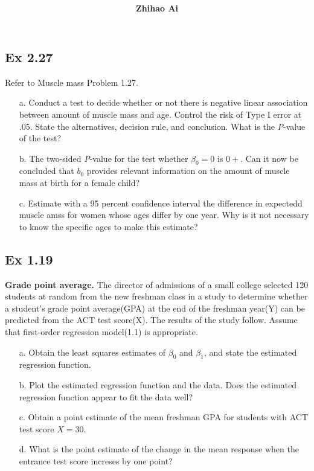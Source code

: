 \documentclass[10pt]{report}
\title{
	\vspace{2in}
	\textmd{\textbf{\hwCourse\\\hwTitle}}\\
	\vspace{0.3in}\large{\textit{\hmwkClassInstructor}}
	\vspace{3in}
}
\author{\textbf{Zhihao Ai}}
\date{}
\begin{document}
\maketitle

\subsection*{Ex 2.27}
Refer to Muscle mass Problem 1.27.
\begin{enumerate}
	\item [a.]
	Conduct a test to decide whether or not there is negative linear association between amount of muscle mass and age. Control the risk of Type I error at .05. State the alternatives, decision rule, and conclusion. What is the \textit{P}-value of the test?
	
	\item [b.]
	The two-sided \textit{P}-value for the test whether $\beta_0 = 0$ is $0+$. Can it now be concluded that $b_0$ provides relevant information on the amount of muscle mass at birth for a female child?
	
	\item [c.]
	Estimate with a 95 percent confidence interval the difference in expectedd muscle amss for women whose ages differ by one year. Why is it not necessary to know the specific ages to make this estimate?
\end{enumerate}

\subsection*{Ex 1.19}
\textbf{Grade point average.} The director of admissions of a small college selected 120 students at random from the new freshman class in a study to determine whether a student's grade point average(GPA) at the end of the freshman year(Y) can be predicted from the ACT test score(X). The results of the study follow. Assume that first-order regression model(1.1) is appropriate.
\begin{enumerate}
	\item [a.]
	Obtain the least squares estimates of $\beta_0$ and $\beta_1$, and state the estimated regression function.
	
	\item [b.]
	Plot the estimated regression function and the data. Does the estimated regression function appear to fit the data well?
	
	\item [c.]
	Obtain a point estimate of the mean freshman GPA for students with ACT test score $X=30$.
	
	\item [d.]
	What is the point estimate of the change in the mean response when the entrance test score increses by one point?
\end{enumerate}
\end{document}
